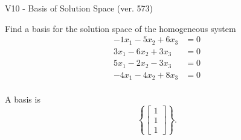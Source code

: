 \begin{exercise}
  \begin{exerciseTitle}V10 - Basis of Solution Space (ver. 573)\end{exerciseTitle}
  \begin{exerciseStatement}
    Find a basis for the solution space of the homogeneous system 
\begin{align*}
 -1 x_ 1 -5 x_ 2 + 6 x_ 3 &= 0  \\ 
  3 x_ 1 -6 x_ 2 + 3 x_ 3 &= 0  \\ 
  5 x_ 1 -2 x_ 2 -3 x_ 3 &= 0  \\ 
  -4 x_ 1 -4 x_ 2 + 8 x_ 3 &= 0  \\ 
 \end{align*}


 
  \end{exerciseStatement}

  \begin{exerciseAnswer}
   A basis is   
\[\left\{\left[\begin{array}{c}
1 \\
1 \\
1
\end{array}\right]\right\}.\]

  


  \end{exerciseAnswer}
\end{exercise}